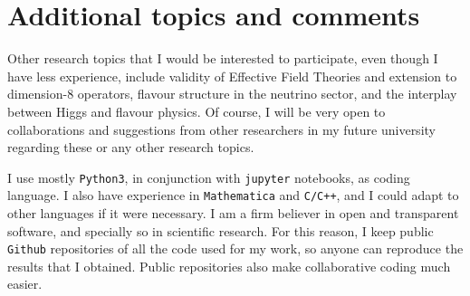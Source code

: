 \documentclass[12pt, a4paper]{article}
\begin{document}
\section{Additional topics and comments}
Other research topics that I would be interested to participate, even though I have less experience, include validity of Effective Field Theories and extension to dimension-8 operators, flavour structure in the neutrino sector, and the interplay between Higgs and flavour physics. Of course, I will be very open to collaborations and suggestions from other researchers in my future university regarding these or any other research topics.

I use mostly \texttt{Python3}, in conjunction with \texttt{jupyter} notebooks, as coding language. I also have experience in \texttt{Mathematica} and \texttt{C/C++}, and I could adapt to other languages if it were necessary. I am a firm believer in open and transparent software, and specially so in scientific research. For this reason, I keep public \texttt{Github} repositories of all the code used for my work, so anyone can reproduce the results that I obtained. Public repositories also make collaborative coding much easier.

\printbibliography[heading=bibintoc]
\end{document}
